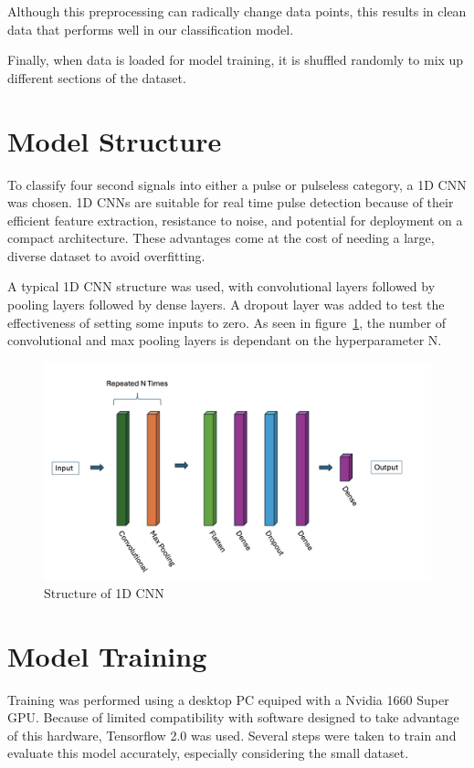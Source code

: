 \documentclass{article}
\begin{document}
Although this preprocessing can radically change data points, this results in clean data that performs well in our classification model.

Finally, when data is loaded for model training, it is shuffled randomly to mix up different sections of the dataset.


\section{Model Structure}

To classify four second signals into either a pulse or pulseless category, a 1D CNN was chosen. 1D CNNs are suitable for real time pulse detection because of their efficient feature extraction, resistance to noise, and potential for deployment on a compact architecture. These advantages come at the cost of needing a large, diverse dataset to avoid overfitting.

A typical 1D CNN structure was used, with convolutional layers followed by pooling layers followed by dense layers. A dropout layer was added to test the effectiveness of setting some inputs to zero. As seen in figure~\ref{fig:model}, the number of convolutional and max pooling layers is dependant on the hyperparameter N.

\begin{figure}[H]
    \centering
    \includegraphics[width=1.0\textwidth]{../media/model.png}
    \caption{Structure of 1D CNN}
    \label{fig:model}
\end{figure}


\section{Model Training} \label{training}

Training was performed using a desktop PC equiped with a Nvidia 1660 Super GPU. Because of limited compatibility with software designed to take advantage of this hardware,  Tensorflow 2.0 was used. Several steps were taken to train and evaluate this model accurately, especially considering the small dataset.
\end{document}
